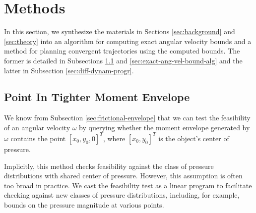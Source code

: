 \documentclass[conference]{IEEEtran}
\begin{document}
\section{Methods}

In this section, we synthesize the materials in Sections
\ref{sec:background} and \ref{sec:theory} into an algorithm for
computing exact angular velocity bounds and a method for planning
convergent trajectories using the computed bounds. The former is
detailed in Subsections \ref{sec:point-in-moment-enve} and
\ref{sec:exact-ang-vel-bound-alg} and the latter in Subsection
\ref{sec:diff-dynam-progr}.



\subsection{Point In Tighter Moment
  Envelope}\label{sec:point-in-moment-enve}

We know from Subsection \ref{sec:frictional-envelope} that we can test
the feasibility of an angular velocity $\omega$ by querying whether
the moment envelope generated by $\omega$ contains the point
$[x_0,y_0,0]^T$, where $[x_0,y_0]^T$ is the object's center of
pressure. 

Implicitly, this method checks feasibility against the class of
pressure distributions with shared center of pressure. However, this
assumption is often too broad in practice. We cast the feasibility
test as a linear program to facilitate checking against new classes of
pressure distributions, including, for example, bounds on the pressure
magnitude at various points.
\end{document}
